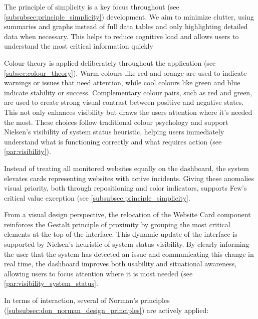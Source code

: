 The principle of simplicity is a key focus throughout (see \ref{subsubsec:principle_simplicity}) development. We aim to minimize clutter, using summaries and graphs instead of full data tables and only highlighting detailed data when necessary. This helps to reduce cognitive load and allows users to understand the most critical information quickly

Colour theory is applied deliberately throughout the application (see \ref{subsec:colour_theory}). Warm colours like red and orange are used to indicate warnings or issues that need attention, while cool colours like green and blue indicate stability or success. Complementary colour pairs, such as red and green, are used to create strong visual contrast between positive and negative states. This not only enhances visibility but draws the users attention where it's needed the most. These choices follow traditional colour psychology and support Nielsen's visibility of system status heuristic, helping users immediately understand what is functioning correctly and what requires action (see \ref{par:visibility}).

Instead of treating all monitored websites equally on the dashboard, the system elevates cards representing websites with active incidents. Giving these anomalies visual priority, both through repositioning and color indicators, supports Few's critical value exception (see \ref{subsubsec:principle_simplicity}.

From a visual design perspective, the relocation of the Website Card component reinforces the Gestalt principle of proximity by grouping the most critical elements at the top of the interface. This dynamic update of the interface is supported by Nielsen's heuristic of system status visibility. By clearly informing the user that the system has detected an issue and communicating this change in real time, the dashboard improves both usability and situational awareness, allowing users to focus attention where it is most needed (see \ref{par:visibility_system_status}.

In terms of interaction, several of Norman's principles (\ref{subsubsec:don_norman_design_principles}) are actively applied:

